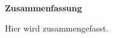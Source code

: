 \cleardoublepage
{}
\thispagestyle{section}

\noindent \textbf{\textsf{\large Zusammenfassung}}\newline

\vspace{1.2em}
\noindent Hier wird zusammengefasst.